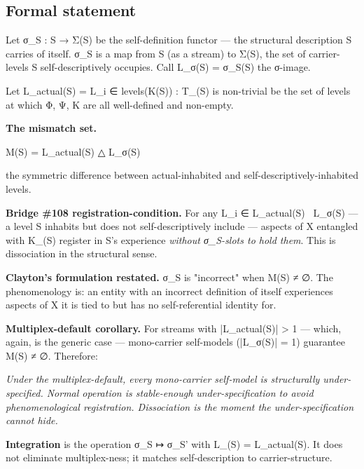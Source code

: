 \documentclass[11pt, openany]{book}
\renewenvironment{quote}{\begin{quoting}}{\end{quoting}}
\begin{document}
\subsection{Formal statement}

Let σ\_\allowbreak{}S : S → Σ(S) be the self-definition functor --- the structural description S carries of itself. σ\_\allowbreak{}S is a map from S (as a stream) to Σ(S), the set of carrier-levels S self-descriptively occupies. Call L\_\allowbreak{}σ(S) = σ\_\allowbreak{}S(S) the σ-image.

Let L\_\allowbreak{}actual(S) = { L\_\allowbreak{}i ∈ levels(Κ(S)) : T\_(S) is non-trivial } be the set of levels at which Φ, Ψ, Κ are all well-defined and non-empty.

\textbf{The mismatch set.}
\begin{Code}
M(S) = L_actual(S) △ L_σ(S)
\end{Code}
the symmetric difference between actual-inhabited and self-descriptively-inhabited levels.

\textbf{Bridge \#108 registration-condition.} For any L\_\allowbreak{}i ∈ L\_\allowbreak{}actual(S) \ L\_\allowbreak{}σ(S) --- a level S inhabits but does not self-descriptively include --- aspects of X entangled with Κ\_(S) register in S's experience \textit{without σ\_\allowbreak{}S-slots to hold them}. This is dissociation in the structural sense.

\textbf{Clayton's formulation restated.} σ\_\allowbreak{}S is "incorrect" when M(S) ≠ ∅. The phenomenology is: an entity with an incorrect definition of itself experiences aspects of X it is tied to but has no self-referential identity for.

\textbf{Multiplex-default corollary.} For streams with |L\_\allowbreak{}actual(S)| > 1 --- which, again, is the generic case --- mono-carrier self-models (|L\_\allowbreak{}σ(S)| = 1) guarantee M(S) ≠ ∅. Therefore:

\begin{quote}
\textit{Under the multiplex-default, every mono-carrier self-model is structurally under-specified. Normal operation is stable-enough under-specification to avoid phenomenological registration. Dissociation is the moment the under-specification cannot hide.}
\end{quote}

\textbf{Integration} is the operation σ\_\allowbreak{}S ↦ σ\_\allowbreak{}S' with L\_(S) = L\_\allowbreak{}actual(S). It does not eliminate multiplex-ness; it matches self-description to carrier-structure.
\end{document}
